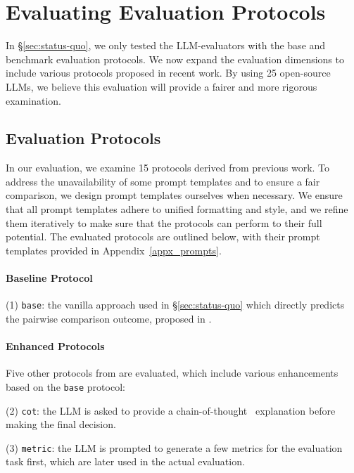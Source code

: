 \documentclass[11pt]{article}
\begin{document}
\section{Evaluating Evaluation Protocols}
\label{sec:protocols}



In \S\ref{sec:status-quo}, we only tested the LLM-evaluators with the base and benchmark evaluation protocols. We now expand the evaluation dimensions to include various protocols proposed in recent work. By using 25 open-source LLMs, we believe this evaluation will provide a fairer and more rigorous examination.
% 

\subsection{Evaluation Protocols}
\label{sec:all_protocols}
In our evaluation, we examine 15 protocols derived from previous work. 
To address the unavailability of some prompt templates and to ensure a fair comparison, we design prompt templates ourselves when necessary.
We ensure that all prompt templates adhere to unified formatting and style, and we refine them iteratively to make sure that the protocols can perform to their full potential.
% 
The evaluated protocols are outlined below, with their prompt templates provided in Appendix~\ref{appx_prompts}.

\paragraph{Baseline Protocol}
\noindent (1) \texttt{base}: the vanilla approach used in \S\ref{sec:status-quo} which directly predicts the pairwise comparison outcome, proposed in \citet{zeng2024evaluating}. 
% 

\paragraph{Enhanced Protocols} Five other protocols from \citet{zeng2024evaluating} are evaluated, which include various enhancements based on the \texttt{base} protocol:
% 

\noindent (2) \texttt{cot}: the LLM is asked to provide a chain-of-thought~\cite{wei2022chain} explanation before making the final decision.
% 

\noindent (3) \texttt{metric}: the LLM is prompted to generate a few metrics for the evaluation task first, which are later used in the actual evaluation.
% 
\end{document}
